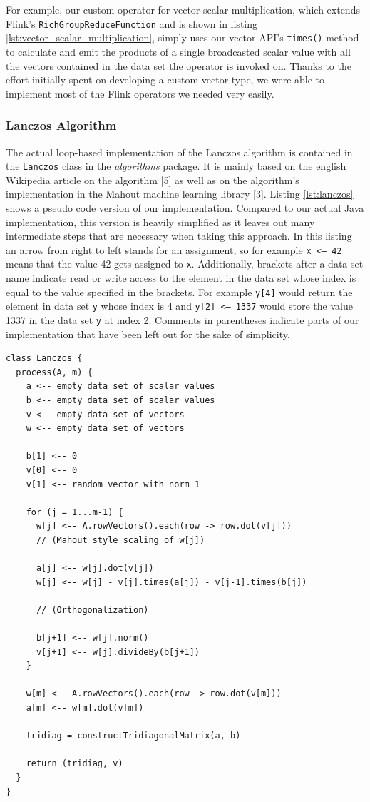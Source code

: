 For example, our custom operator for vector-scalar multiplication, which
extends Flink's \texttt{RichGroupReduceFunction} and is shown in listing
\ref{lst:vector_scalar_multiplication}, simply uses our vector API's
\texttt{times()} method to calculate and emit the products of a single
broadcasted scalar value with all the vectors contained in the data set the
operator is invoked on. Thanks to the effort initially spent on developing a
custom vector type, we were able to implement most of the Flink operators we
needed very easily.

\subsubsection{Lanczos Algorithm}

The actual loop-based implementation of the Lanczos algorithm is contained in
the \texttt{Lanczos} class in the \textit{algorithms} package. It is mainly
based on the english Wikipedia article on the algorithm [5] as well as on the
algorithm's implementation in the Mahout machine learning library [3]. Listing
\ref{lst:lanczos} shows a pseudo code version of our implementation. Compared
to our actual Java implementation, this version is heavily simplified as it
leaves out many intermediate steps that are necessary when taking this
approach. In this listing an arrow from right to left stands for an assignment,
so for example \texttt{x <-- 42} means that the value 42 gets assigned to
\texttt{x}. Additionally, brackets after a data set name indicate read or write
access to the element in the data set whose index is equal to the value
specified in the brackets. For example \texttt{y[4]} would return the element
in data set \texttt{y} whose index is 4 and \texttt{y[2] <-- 1337} would store
the value 1337 in the data set \texttt{y} at index 2. Comments in parentheses
indicate parts of our implementation that have been left out for the sake of
simplicity.

\begin{lstlisting}[label=lst:lanczos,captionpos=b,caption=Pseudo code of our
loop-based Lanczos algorithm implementation (simplified)]
class Lanczos {
  process(A, m) {
    a <-- empty data set of scalar values
    b <-- empty data set of scalar values
    v <-- empty data set of vectors
    w <-- empty data set of vectors
    
    b[1] <-- 0
    v[0] <-- 0
    v[1] <-- random vector with norm 1
    
    for (j = 1...m-1) {
      w[j] <-- A.rowVectors().each(row -> row.dot(v[j]))
      // (Mahout style scaling of w[j])
      
      a[j] <-- w[j].dot(v[j])
      w[j] <-- w[j] - v[j].times(a[j]) - v[j-1].times(b[j])
      
      // (Orthogonalization)
      
      b[j+1] <-- w[j].norm()
      v[j+1] <-- w[j].divideBy(b[j+1])
    }
    
    w[m] <-- A.rowVectors().each(row -> row.dot(v[m]))
    a[m] <-- w[m].dot(v[m])
    
    tridiag = constructTridiagonalMatrix(a, b)
    
    return (tridiag, v)
  }
}
\end{lstlisting}

